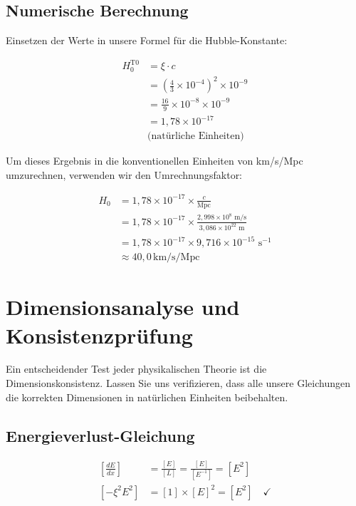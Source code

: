 	\subsection{Numerische Berechnung}
	
	Einsetzen der Werte in unsere Formel für die Hubble-Konstante:
	
\begin{align}
	H_0^{\text{T0}} &= \xi \cdot c \\
	&= \left(\frac{4}{3} \times 10^{-4}\right)^2 \times 10^{-9} \\
	&= \frac{16}{9} \times 10^{-8} \times 10^{-9} \\
	&= 1{,}78 \times 10^{-17} \qquad \\
	&\text{(natürliche Einheiten)}
\end{align}
	
	Um dieses Ergebnis in die konventionellen Einheiten von km/s/Mpc umzurechnen, verwenden wir den Umrechnungsfaktor:
	
	\begin{align}
		H_0 &= 1{,}78 \times 10^{-17} \times \frac{c}{\text{Mpc}} \\
		&= 1{,}78 \times 10^{-17} \times \frac{2{,}998 \times 10^8 \text{ m/s}}{3{,}086 \times 10^{22} \text{ m}} \\
		&= 1{,}78 \times 10^{-17} \times 9{,}716 \times 10^{-15} \text{ s}^{-1} \\
		&\approx 40{,}0\,\text{km/s/Mpc}
	\end{align}
	
	\section{Dimensionsanalyse und Konsistenzprüfung}
	
	Ein entscheidender Test jeder physikalischen Theorie ist die Dimensionskonsistenz. Lassen Sie uns verifizieren, dass alle unsere Gleichungen die korrekten Dimensionen in natürlichen Einheiten beibehalten.
	
	\subsection{Energieverlust-Gleichung}
	
	\begin{align}
		\left[\frac{dE}{dx}\right] &= \frac{[E]}{[L]} = \frac{[E]}{[E^{-1}]} = [E^2] \\
		\left[-\xi^2 E^2\right] &= [1] \times [E]^2 = [E^2] \quad \checkmark
	\end{align}
	
